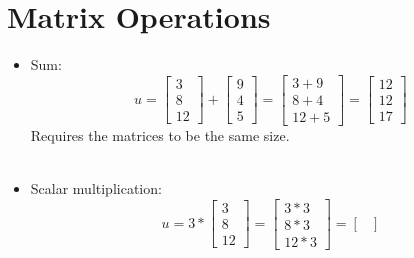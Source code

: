 \documentclass[nobib]{tufte-handout}
\begin{document}
\section{Matrix Operations}
\begin{itemize}
    \item Sum:\\
          \begin{equation*}
              u =
              \begin{bmatrix}
                  3 \\
                  8 \\
                  12
              \end{bmatrix}
              +
              \begin{bmatrix}
                  9 \\
                  4 \\
                  5
              \end{bmatrix}
              =
              \begin{bmatrix}
                  3+9 \\
                  8+4 \\
                  12+5
              \end{bmatrix} =
              \begin{bmatrix}
                  12 \\
                  12 \\
                  17
              \end{bmatrix}
          \end{equation*}
          Requires the matrices to be the same size.\\~\\
    \item Scalar multiplication:
          \begin{equation*}
              u = 3*
              \begin{bmatrix}
                  3 \\
                  8 \\
                  12
              \end{bmatrix}
              =
              \begin{bmatrix}
                  3*3 \\
                  8*3 \\
                  12*3
              \end{bmatrix} =
              \begin{bmatrix}

\end{bmatrix}
\end{equation*}
\end{itemize}
\end{document}
